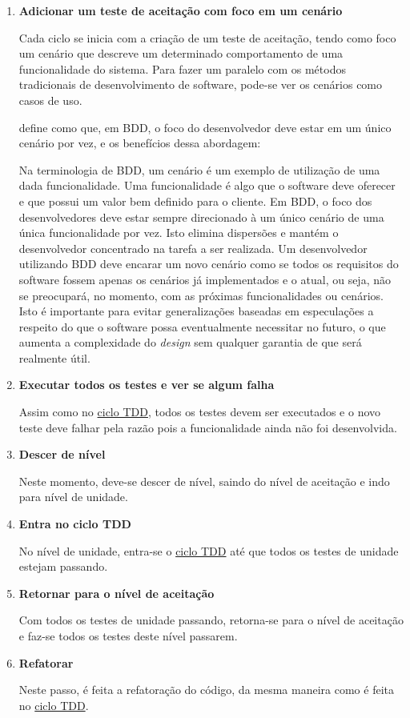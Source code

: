 \begin{enumerate}
\item \textbf{Adicionar um teste de aceitação com foco em um cenário}

Cada ciclo se inicia com a criação de um teste de aceitação, tendo como foco um cenário que descreve um determinado comportamento de uma funcionalidade do sistema. Para fazer um paralelo com os métodos tradicionais de desenvolvimento de software, pode-se ver os cenários como casos de uso.

 define como que, em BDD, o foco do desenvolvedor deve estar em um único cenário por vez, e os benefícios dessa abordagem:

\begin{citacao}
Na terminologia de BDD, um cenário é um exemplo de utilização de uma dada funcionalidade. Uma funcionalidade é algo que o software deve oferecer e que possui um valor bem definido para o cliente. Em BDD, o foco dos desenvolvedores deve estar sempre direcionado à um único cenário de uma única funcionalidade por vez. Isto elimina dispersões e mantém o desenvolvedor concentrado na tarefa a ser realizada. Um desenvolvedor utilizando BDD deve encarar um novo cenário como se todos os requisitos do software fossem apenas os cenários já implementados e o atual, ou seja, não se preocupará, no momento, com as próximas funcionalidades ou cenários. Isto é importante para evitar generalizações baseadas em especulações a respeito do que o software possa eventualmente necessitar no futuro, o que aumenta a complexidade do \textit{design} sem qualquer garantia de que será realmente útil.
\end{citacao}

\item \textbf{Executar todos os testes e ver se algum falha}

Assim como no \hyperref[ssub:ciclo_tdd]{ciclo TDD}, todos os testes devem ser executados e o novo teste deve falhar pela razão pois a funcionalidade ainda não foi desenvolvida.

\item \textbf{Descer de nível}

Neste momento, deve-se descer de nível, saindo do nível de aceitação e indo para nível de unidade.

\item \textbf{Entra no ciclo TDD}

No nível de unidade, entra-se o \hyperref[ssub:ciclo_tdd]{ciclo TDD} até que todos os testes de unidade estejam passando.

\item \textbf{Retornar para o nível de aceitação}

Com todos os testes de unidade passando, retorna-se para o nível de aceitação e faz-se todos os testes deste nível passarem.

\item \textbf{Refatorar}

Neste passo, é feita a refatoração do código, da mesma maneira como é feita no \hyperref[ssub:ciclo_tdd]{ciclo TDD}.

\end{enumerate}

